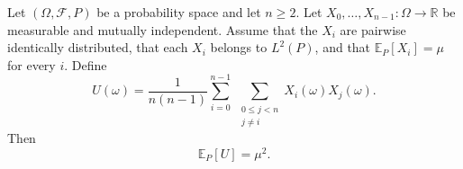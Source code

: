 \begin{theorem}
Let $(\Omega,\mathcal F,P)$ be a probability space and let $n\geq2$.
Let $X_0,\ldots,X_{n-1}:\Omega\to\mathbb R$ be measurable and mutually
independent. Assume that the $X_i$ are pairwise identically distributed,
that each $X_i$ belongs to $L^2(P)$, and that
$\mathbb E_P[X_i]=\mu$ for every $i$. Define
\[
 U(\omega)=\frac{1}{n(n-1)}
 \sum_{i=0}^{n-1}\ \sum_{\substack{0\leq j<n\\j\ne i}}
 X_i(\omega)X_j(\omega).
\]
Then
\[
 \mathbb E_P[U]=\mu^2.
\]
\end{theorem}
